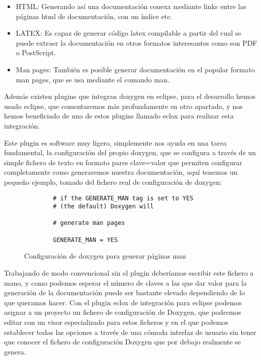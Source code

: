 \begin{itemize}

\item HTML: Generando así una documentación conexa mediante links entre las páginas html de documentación, con un índice etc.

\item LATEX: Es capaz de generar código latex compilable a partir del cual se puede extraer la documentación en otros formatos interesantes como son PDF o PostScript.

\item Man pages: También es posible generar documentación en el popular formato man pages, que se usa mediante el comando man.

\end{itemize}

Además existen plugins que integran doxygen en eclipse, para el desarrollo hemos usado eclipse, que comentaremos más profundamente en otro apartado, y nos hemos beneficiado de uno de estos plugins llamado eclox para realizar esta integración.

Este plugin es software muy ligero, simplemente nos ayuda en una tarea fundamental, la configuración del propio doxygen, que se configura a través de un simple fichero de texto en formato pares clave=valor que permiten configurar completamente como generaremos nuestra documentación, aquí tenemos un pequeño ejemplo, tomado del fichero real de configuración de doxygen:

 \begin{figure}[t]
 \begin{lstlisting}
		# if the GENERATE_MAN tag is set to YES
		# (the default) Doxygen will
	
 		# generate man pages 
		
		GENERATE_MAN = YES
\end{lstlisting}
\caption{Configuración de doxygen para generar páginas man}
\label{FIG:DoxygenConfig}
\end{figure}

Trabajando de modo convencional sin el plugin deberíamos escribir este fichero a mano, y como podemos esperar el número de claves a las que dar valor para la generación de la documentación puede ser bastante elevado dependiendo de lo que queramos hacer. Con el plugin eclox de integración para eclipse podemos asignar a un proyecto un fichero de configuración de Doxygen, que podremos editar con un visor especializado para estos ficheros y en el que podemos establecer todas las opciones a través de una cómoda interfaz de usuario sin tener que conocer el fichero de configuración Doxygen que por debajo realmente se genera.

